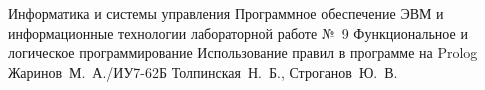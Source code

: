 \documentclass[a4paper,oneside,14pt]{extarticle}
\begin{document}
\makereporttitle
{Информатика и системы управления} %
{Программное обеспечение ЭВМ и информационные технологии} %
{лабораторной работе №~9} %
{Функциональное и логическое программирование} %
{Использование правил в программе на Prolog} %
{} %
{Жаринов~М.~А./ИУ7-62Б} %
{Толпинская~Н.~Б., Строганов~Ю.~В.} %

\setcounter{page}{2}





\end{document}
